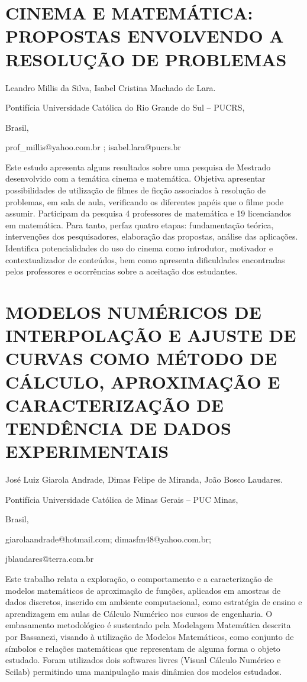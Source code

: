 \section{CINEMA E MATEMÁTICA: PROPOSTAS ENVOLVENDO A RESOLUÇÃO DE PROBLEMAS }

\begin{datos}

Leandro Millis da Silva, Isabel Cristina Machado de Lara.

Pontifícia Universidade Católica do Rio Grande do Sul – PUCRS,

Brasil,

prof\_millis@yahoo.com.br ; isabel.lara@pucrs.br

\end{datos}

Este estudo apresenta alguns resultados sobre uma pesquisa de Mestrado
desenvolvido com a temática cinema e matemática. Objetiva apresentar
possibilidades de utilização de filmes de ficção associados à resolução
de problemas, em sala de aula, verificando os diferentes papéis que
o filme pode assumir. Participam da pesquisa 4 professores de matemática
e 19 licenciandos em matemática. Para tanto, perfaz quatro etapas:
fundamentação teórica, intervenções dos pesquisadores, elaboração
das propostas, análise das aplicações. Identifica potencialidades
do uso do cinema como introdutor, motivador e contextualizador de
conteúdos, bem como apresenta dificuldades encontradas pelos professores
e ocorrências sobre a aceitação dos estudantes.


\section{MODELOS NUMÉRICOS DE INTERPOLAÇÃO E AJUSTE DE CURVAS COMO MÉTODO
DE CÁLCULO, APROXIMAÇÃO E CARACTERIZAÇÃO DE TENDÊNCIA DE DADOS EXPERIMENTAIS}

\begin{datos}

José Luiz Giarola Andrade, Dimas Felipe de Miranda, João Bosco Laudares.

Pontifícia Universidade Católica de Minas Gerais – PUC Minas,

Brasil,

giarolaandrade@hotmail.com; dimasfm48@yahoo.com.br; 

jblaudares@terra.com.br 

\end{datos}

Este trabalho relata a exploração, o comportamento e a caracterização
de modelos matemáticos de aproximação de funções, aplicados em amostras
de dados discretos, inserido em ambiente computacional, como estratégia
de ensino e aprendizagem em aulas de Cálculo Numérico nos cursos de
engenharia. O embasamento metodológico é sustentado pela Modelagem
Matemática descrita por Bassanezi, visando à utilização de Modelos
Matemáticos, como conjunto de símbolos e relações matemáticas que
representam de alguma forma o objeto estudado. Foram utilizados dois
softwares livres (Visual Cálculo Numérico e Scilab) permitindo uma
manipulação mais dinâmica dos modelos estudados.

